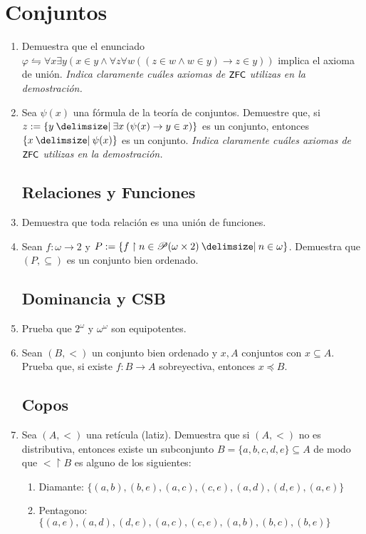 \documentclass[11pt]{article}
\providecommand\st{\;|\;}
\newcommand\SetSymbol[1][]{%
    \nonscript\:#1\vert
    \allowbreak
    \nonscript\:
    \mathopen{}}
\renewcommand\st{\SetSymbol[\delimsize]}
\renewcommand\st{\SetSymbol[\delimsize]}
\newcommand{\zfc}{\text{\textsf{\small ZFC}}}
\begin{document}
    
    \section*{Conjuntos}
    \begin{enumerate}[\bf\text{Ej.} 1.]

    \subsection*{Axiomas Básicos}
    \item Demuestra que el enunciado $\varphi \leftrightharpoons \forall x\exists y (x\in y \wedge \forall z \forall w ((z\in w \wedge w\in y) \rightarrow z\in y))$ implica el axioma de unión.
    \textit{Indica claramente cuáles axiomas de $\zfc$ utilizas en la demostración.}

    \item Sea $\psi(x)$ una fórmula de la teoría de conjuntos. Demuestre que, si $z:=\{ y \st \exists x \: (\psi(x) \to y \in x) \}$ es un conjunto, entonces $\{x \st \psi(x)\}$ es un conjunto.
    \textit{Indica claramente cuáles axiomas de $\zfc$ utilizas en la demostración.}

    \subsection*{Relaciones y Funciones}
    \item Demuestra que toda relación es una unión de funciones.
    \item Sean $f:\omega \to 2$ y $P:=\{ f \upharpoonright n \in \mathscr{P}(\omega \times 2) \st n \in \omega \}$. Demuestra que $(P,\subseteq)$ es un conjunto bien ordenado.
    
    \subsection*{Dominancia y CSB}
    \item Prueba que $2^\omega$ y $\omega ^ \omega$ son equipotentes.
    
    \item Sean $(B,<)$ un conjunto bien ordenado y $x,A$ conjuntos con $x \subseteq A$. Prueba que, si existe $f:B \to A$ sobreyectiva, entonces $x \preccurlyeq B$.
    
    \subsection*{Copos}
    \item Sea $(A,<)$ una retícula (latiz). Demuestra que si $(A,<)$ no es distributiva, entonces existe un subconjunto $B=\{a,b,c,d,e\} \subseteq A$ de modo que $< \upharpoonright B$ es alguno de los siguientes:
    \begin{enumerate}
        \item Diamante: $\{(a,b),(b,e),(a,c),(c,e),(a,d),(d,e),(a,e)\}$
        \item Pentagono: $\{(a,e),(a,d),(d,e),(a,c),(c,e),(a,b),(b,c),(b,e)\}$
    \end{enumerate}


\end{enumerate}
\end{document}
